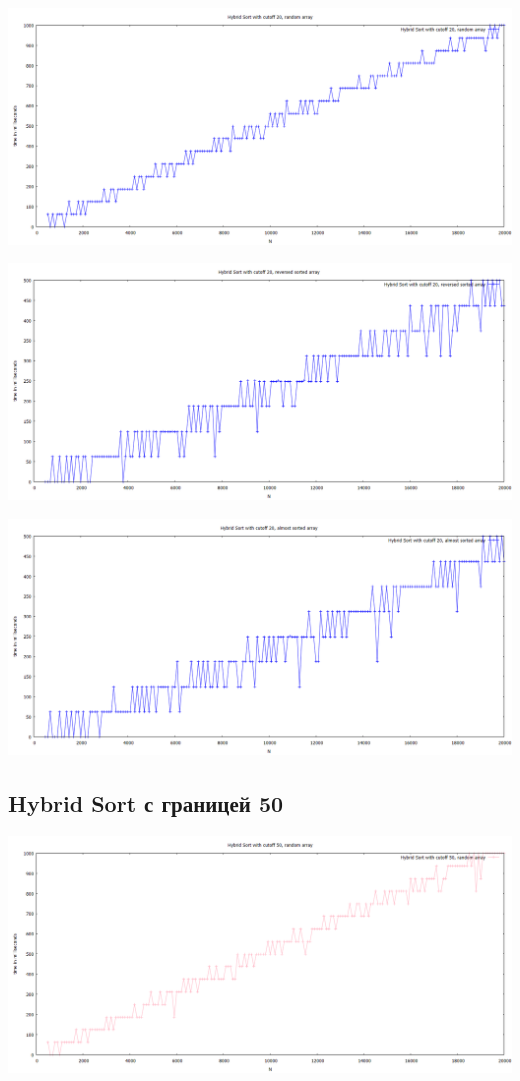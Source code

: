 \documentclass[11pt,a4paper]{article}
\begin{document}
\hspace*{-2cm} \includegraphics[scale=0.5]{hybrid_sort_20_random_arr.PNG}

\hspace*{-2cm} \includegraphics[scale=0.5]{hybrid_sort_20_reversed_arr.PNG}

\hspace*{-2cm} \includegraphics[scale=0.5]{hybrid_sort_20_almost_sorted_arr.PNG}

\subsection*{Hybrid Sort с границей 50}

\hspace*{-2cm} \includegraphics[scale=0.5]{hybrid_sort_50_random_arr.PNG}
\end{document}
